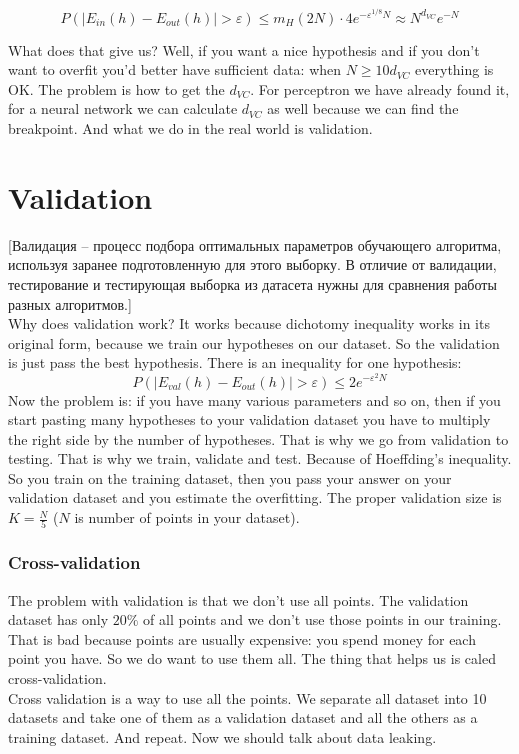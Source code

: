 $$P(|E_{in}(h)-E_{out}(h)|>\varepsilon)\le m_H(2N)\cdot4e^{-\varepsilon^{1/8}N}\approx N^{d_{VC}}e^{-N}$$

What does that give us? Well, if you want a nice hypothesis and if you don't want to overfit you'd better have sufficient data: when $N\ge 10d_{VC}$ everything is OK. The problem is how to get the $d_{VC}$. For perceptron we have already found it, for a neural network we can calculate $d_{VC}$ as well because we can find the breakpoint. And what we do in the real world is validation.

\section{Validation}

[Валидация -- процесс подбора оптимальных параметров обучающего алгоритма, используя заранее подготовленную для этого выборку. В отличие от валидации, тестирование и тестирующая выборка из датасета нужны для сравнения работы разных алгоритмов.]\\
Why does validation work? It works because dichotomy inequality works in its original form, because we train our hypotheses on our dataset. So the validation is just pass the best hypothesis. There is an inequality for one hypothesis:
$$P(|E_{val}(h)-E_{out}(h)|>\varepsilon)\le2e^{-\varepsilon^2N}$$
Now the problem is: if you have many various parameters and so on, then if you start pasting many hypotheses to your validation dataset you have to multiply the right side by the number of hypotheses. That is why we go from validation to testing. That is why we train, validate and test. Because of Hoeffding's inequality. So you train on the training dataset, then you pass your answer on your validation dataset and you estimate the overfitting. The proper validation size is $K=\frac{N}{5}$ ($N$ is number of points in your dataset).

\subsubsection*{Cross-validation}

The problem with validation is that we don't use all points. The validation dataset has only $20\%$ of all points and we don't use those points in our training. That is bad because points are usually expensive: you spend money for each point you have. So we do want to use them all. The thing that helps us is caled cross-validation.\\
Cross validation is a way to use all the points. We separate all dataset into 10 datasets and take one of them as a validation dataset and all the others as a training dataset. And repeat. Now we should talk about data leaking.

